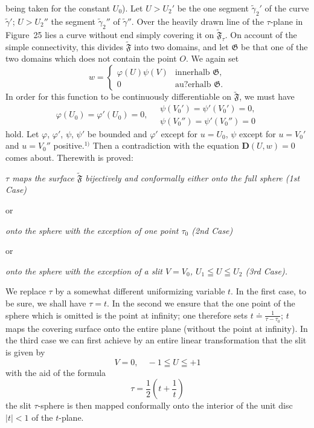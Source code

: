 \documentclass{article}
\begin{document}
being taken for the constant $U_0$). Let $U > U_2'$ be the one segment $\tilde{\gamma}_2'$ of the curve $\tilde{\gamma}'$; $U > U_2''$ the segment $\tilde{\gamma}_2''$ of $\tilde{\gamma}''$. Over the heavily drawn line of the $\tau$-plane in Figure~25 lies a curve without end simply covering it on $\widetilde{\mathfrak{F}}_\tau$. On account of the simple connectivity, this divides $\widetilde{\mathfrak{F}}$ into two domains, and let $\mathfrak{G}$ be that one of the two domains which does not contain the point $O$. We again set
\[ w = \begin{cases} \varphi(U)\psi(V) & \text{innerhalb } \mathfrak{G}, \\ 0 & \text{au?erhalb } \mathfrak{G}. \end{cases} \]
In order for this function to be continuously differentiable on $\widetilde{\mathfrak{F}}$, we must have
\[ \varphi(U_0) = \varphi'(U_0) = 0, \quad \begin{gathered} \psi(V_0') = \psi'(V_0') = 0, \\ \psi(V_0'') = \psi'(V_0'') = 0 \end{gathered} \]
hold. Let $\varphi$, $\varphi'$, $\psi$, $\psi'$ be bounded and $\varphi'$ except for $u = U_0$, $\psi$ except for $u = V_0'$ and $u = V_0''$ positive.${}^{1)}$ Then a contradiction with the equation $\mathbf{D}(U, w) = 0$ comes about. Therewith is proved:

\emph{$\tau$ maps the surface $\widetilde{\mathfrak{F}}$ bijectively and conformally either onto the full sphere (1st Case)}

or

\emph{onto the sphere with the exception of one point $\tau_0$ (2nd Case)}

or

\emph{onto the sphere with the exception of a slit $V = V_0$, $U_1 \leqq U \leqq U_2$ (3rd Case).}

We replace $\tau$ by a somewhat different uniformizing variable $t$. In the first case, to be sure, we shall have $\tau = t$. In the second we ensure that the one point of the sphere which is omitted is the point at infinity; one therefore sets $t \doteq \frac{1}{\tau - \tau_0}$; $t$ maps the covering surface onto the entire plane (without the point at infinity). In the third case we can first achieve by an entire linear transformation that the slit is given by
\[ V = 0, \quad -1 \leqq U \leqq +1 \]
with the aid of the formula
\[ \tau = \frac{1}{2} \left( t + \frac{1}{t} \right) \]
the slit $\tau$-sphere is then mapped conformally onto the interior of the unit disc $|t| < 1$ of the $t$-plane.
\end{document}
